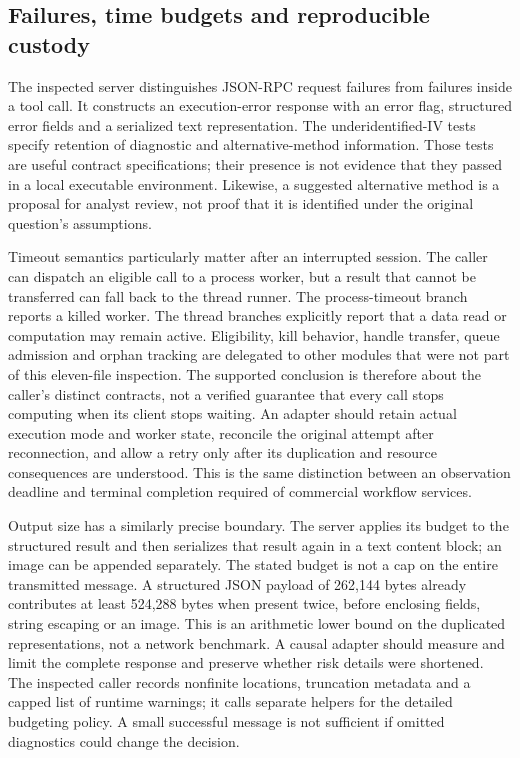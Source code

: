 \subsection{Failures, time budgets and reproducible custody}
\label{exec23:statspai-contract-runtime}
The inspected server distinguishes JSON-RPC request failures from failures
inside a tool call. It constructs an execution-error response with an error
flag, structured error fields and a serialized text representation. The
underidentified-IV tests specify retention of diagnostic and alternative-method
information. Those tests are useful contract specifications; their presence
is not evidence that they passed in a local executable environment. Likewise,
a suggested alternative method is a proposal for analyst review, not proof
that it is identified under the original question's assumptions.
\citep{exec23_statspai_contract}

Timeout semantics particularly matter after an interrupted session. The caller
can dispatch an eligible call to a process worker, but a result that cannot be
transferred can fall back to the thread runner. The process-timeout branch
reports a killed worker. The thread branches explicitly report that a data read
or computation may remain active. Eligibility, kill behavior, handle transfer,
queue admission and orphan tracking are delegated to other modules that were
not part of this eleven-file inspection. The supported conclusion is therefore
about the caller's distinct contracts, not a verified guarantee that every
call stops computing when its client stops waiting. An adapter should retain
actual execution mode and worker state, reconcile the original attempt after
reconnection, and allow a retry only after its duplication and resource
consequences are understood. This is the same distinction between an
observation deadline and terminal completion required of commercial workflow
services.
\citep{exec23_statspai_contract}

Output size has a similarly precise boundary. The server applies its budget
to the structured result and then serializes that result again in a text
content block; an image can be appended separately. The stated budget is not
a cap on the entire transmitted message. A structured JSON payload of
262,144 bytes already contributes at least 524,288 bytes when present twice,
before enclosing fields, string escaping or an image. This is an arithmetic
lower bound on the duplicated representations, not a network benchmark.
A causal adapter should measure and limit the complete response and preserve
whether risk details were shortened. The inspected caller records nonfinite
locations, truncation metadata and a capped list of runtime warnings; it calls
separate helpers for the detailed budgeting policy. A small successful message
is not sufficient if omitted diagnostics could change the decision.
\citep{exec23_statspai_contract,exec23_statspai_contract_reference}

